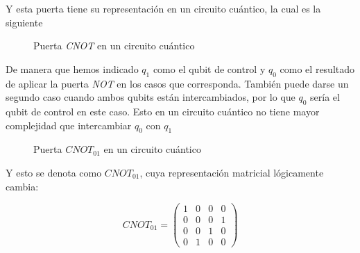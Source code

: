 \documentclass[12pt]{article}
\numberwithin{equation}{section} %
\begin{document}
    Y esta puerta tiene su representación en un circuito cuántico, la cual es la siguiente

    \vspace{5mm}

    \begin{figure}[!h]
        \centering
        \caption{Puerta \textit{CNOT} en un circuito cuántico}
        \label{fig:puerta_cnot_circuito_cuantico}
    \end{figure}
    
    

    \vspace{2.5mm}

    De manera que hemos indicado \( q_{1} \) como el qubit de control y \( q_{0} \) como el resultado de aplicar la puerta \textit{NOT} en los casos que corresponda. También puede darse un segundo caso cuando ambos qubits están intercambiados, por lo que \( q_{0} \) sería el qubit de control en este caso. Esto en un circuito cuántico no tiene mayor complejidad que intercambiar \( q_{0} \) con \( q_{1} \)

    \vspace{5mm}

    \begin{figure}[!h]
        \centering
        \caption{Puerta \(\textit{CNOT}_{01} \) en un circuito cuántico}
        \label{fig: puerta_cnot_01_circuito_cuantico}
    \end{figure}

    \vspace{2.5mm}

    Y esto se denota como \(\textit{CNOT}_{01} \), cuya representación matricial lógicamente cambia:

    \begin{equation}
        \textit{CNOT}_{01} = \begin{pmatrix}
            1 & 0 & 0 & 0 \\
            0 & 0 & 0 & 1 \\
            0 & 0 & 1 & 0 \\
            0 & 1 & 0 & 0
        \end{pmatrix}
    \end{equation}
\end{document}
